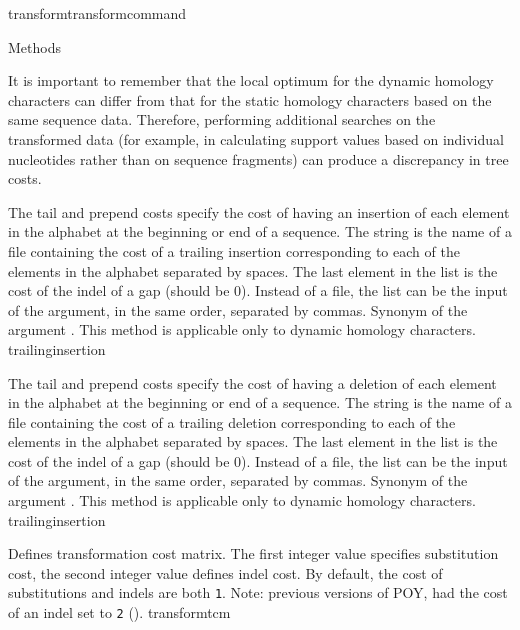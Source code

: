 \begin{command}{transform}{transformcommand}
\begin{arguments}
\begin{argumentgroup}{Methods}
	\begin{statement}
  	  It is important to remember that the local optimum for the dynamic homology
	  characters can differ from that for the static homology characters based on the
	  same sequence data. Therefore, performing additional searches on the transformed
	  data (for example, in calculating support values based on individual nucleotides
	  rather than on sequence fragments) can produce a discrepancy in tree costs.
	\end{statement}

            {The tail and prepend costs specify the cost of having an insertion of
            each element in the alphabet at the beginning or end
            of a sequence. The string is the name of a file containing the cost of
            a trailing insertion corresponding to each of the elements
            in the alphabet separated by spaces. The last element in the list is the
            cost of the indel of a gap (should be 0). Instead of a file, the list can
            be the input of the argument, in the same order, separated by commas.
            Synonym of the argument . This method is applicable only to 
            dynamic homology characters.} 
            {trailinginsertion}

            {The tail and prepend costs specify the cost of having a deletion
            of each element in the alphabet at the beginning or end
            of a sequence. The string is the name of a file containing the cost of
            a trailing deletion corresponding to each of the elements
            in the alphabet separated by spaces. The last element in the list is the
            cost of the indel of a gap (should be 0). Instead of a file, the list can
            be the input of the argument, in the same order, separated by commas.
            Synonym of the argument . This method is applicable only to 
            dynamic homology characters.} 
            {trailinginsertion}

            {Defines transformation cost matrix. The first integer value specifies
            substitution cost, the second integer value defines indel cost. By default,
            the cost of substitutions and indels are both \texttt{1}.  Note: previous versions of POY, had
            the cost of an indel set to \texttt{2}
            ().}
            {transformtcm}


\end{argumentgroup}
\end{arguments}
\end{command}
